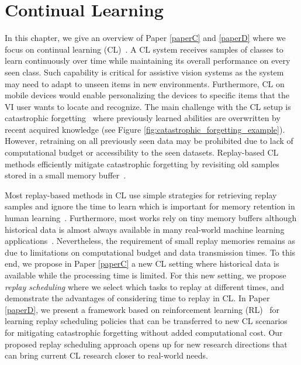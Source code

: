 

\chapter{Continual Learning}\label{chap4}

In this chapter, we give an overview of Paper \ref{paperC} and \ref{paperD} where we focus on continual learning (CL)~\cite{delange2021continual,parisi2019continual}. A CL system receives samples of classes to learn continuously over time while maintaining its overall performance on every seen class. Such capability is critical for assistive vision systems as the system may need to adapt to unseen items in new environments. Furthermore, CL on mobile devices would enable personalizing the devices to specific items that the VI user wants to locate and recognize. 
The main challenge with the CL setup is catastrophic forgetting~\cite{mccloskey1989catastrophic} where previously learned abilities are overwritten by recent acquired knowledge (see Figure \ref{fig:catastrophic_forgetting_example}). However, retraining on all previously seen data may be prohibited due to lack of computational budget or accessibility to the seen datasets. Replay-based CL methods efficiently mitigate catastrophic forgetting by revisiting old samples stored in a small memory buffer~\cite{chaudhry2019tiny,lopez2017gradient,hayes2020remind}. 

Most replay-based methods in CL use simple strategies for retrieving replay samples and ignore the time to learn which is important for memory retention in human learning~\cite{dempster1989spacing,landauer1978optimum,hawley2008comparison}. 
Furthermore, most works rely on tiny memory buffers although historical data is almost always available in many real-world machine learning applications~\cite{mitchell1999machinelearning,bailis2017macrobase,hazelwood2018applied}. Nevertheless, the requirement of small replay memories remains as due to limitations on computational budget and data transmission times. 
To this end, we propose in Paper \ref{paperC} a new CL setting where historical data is
available while the processing time is limited. For this new setting, we propose \textit{replay scheduling} where we select which tasks to replay at different times, and demonstrate the advantages of considering time to replay in CL. 
In Paper \ref{paperD}, we present a framework based on reinforcement learning (RL)~\cite{sutton2018reinforcement} for learning replay scheduling policies that can be transferred to new CL scenarios for mitigating catastrophic forgetting without added computational cost. 
Our proposed replay scheduling approach opens up for new research directions that can bring current CL research closer to real-world needs. 


